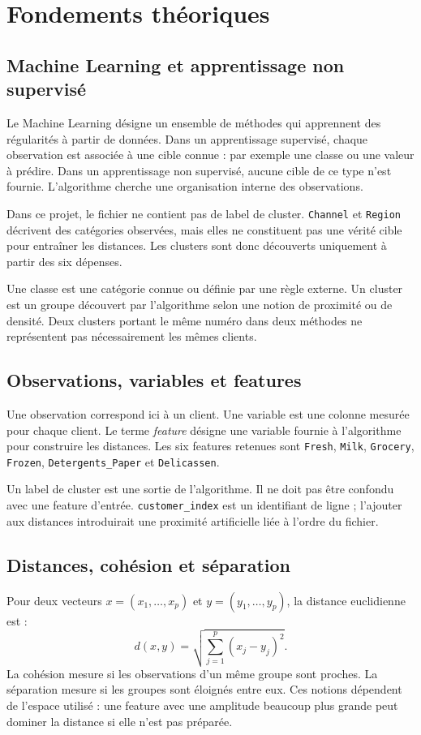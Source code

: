\chapter{Fondements théoriques}

\section{Machine Learning et apprentissage non supervisé}
Le Machine Learning désigne un ensemble de méthodes qui apprennent des régularités à partir de données. Dans un apprentissage supervisé, chaque observation est associée à une cible connue : par exemple une classe ou une valeur à prédire. Dans un apprentissage non supervisé, aucune cible de ce type n'est fournie. L'algorithme cherche une organisation interne des observations.

Dans ce projet, le fichier ne contient pas de label de cluster. \texttt{Channel} et \texttt{Region} décrivent des catégories observées, mais elles ne constituent pas une vérité cible pour entraîner les distances. Les clusters sont donc découverts uniquement à partir des six dépenses.

\begin{pedagogie}
Une classe est une catégorie connue ou définie par une règle externe. Un cluster est un groupe découvert par l'algorithme selon une notion de proximité ou de densité. Deux clusters portant le même numéro dans deux méthodes ne représentent pas nécessairement les mêmes clients.
\end{pedagogie}

\section{Observations, variables et features}
Une observation correspond ici à un client. Une variable est une colonne mesurée pour chaque client. Le terme \textit{feature} désigne une variable fournie à l'algorithme pour construire les distances. Les six features retenues sont \texttt{Fresh}, \texttt{Milk}, \texttt{Grocery}, \texttt{Frozen}, \texttt{Detergents\_Paper} et \texttt{Delicassen}.

Un label de cluster est une sortie de l'algorithme. Il ne doit pas être confondu avec une feature d'entrée. \texttt{customer\_index} est un identifiant de ligne ; l'ajouter aux distances introduirait une proximité artificielle liée à l'ordre du fichier.

\section{Distances, cohésion et séparation}
Pour deux vecteurs $x=(x_1,\ldots,x_p)$ et $y=(y_1,\ldots,y_p)$, la distance euclidienne est :
\begin{equation}
d(x,y)=\sqrt{\sum_{j=1}^{p}(x_j-y_j)^2}.
\end{equation}
La cohésion mesure si les observations d'un même groupe sont proches. La séparation mesure si les groupes sont éloignés entre eux. Ces notions dépendent de l'espace utilisé : une feature avec une amplitude beaucoup plus grande peut dominer la distance si elle n'est pas préparée.

